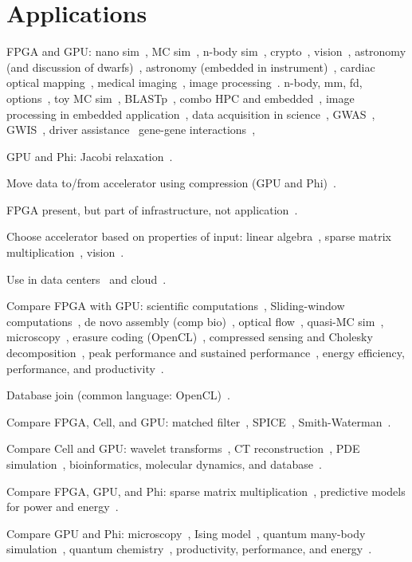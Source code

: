 \section{Applications}
\label{sec:apps}

FPGA and GPU:
nano sim~\cite{khdo06},
MC sim~\cite{shsc08,tttl10},
n-body sim~\cite{tl10},
crypto~\cite{dfg+13},
vision~\cite{bkdb10,brf14,ghgb11},
astronomy (and discussion of dwarfs)~\cite{ibs12},
astronomy (embedded in instrument)~\cite{kgb+14},
cardiac optical mapping~\cite{mjk12},
medical imaging~\cite{szb+12,sll13},
image processing~\cite{dbd+13}.
n-body, mm, fd, options~\cite{whk+14},
toy MC sim~\cite{admb14},
BLASTp~\cite{Papad14},
combo HPC and embedded~\cite{rpm+15},
image processing in embedded application~\cite{enr+18,nsg+16,zxl+18},
data acquisition in science~\cite{cab+17,vac+16},
GWAS~\cite{kws+16},
GWIS~\cite{wkhe17},
driver assistance~\cite{wlhk17}
gene-gene interactions~\cite{wkhe18},

GPU and Phi:
Jacobi relaxation~\cite{cv16}.

Move data to/from accelerator using compression (GPU and Phi)~\cite{bkp15}.

FPGA present, but part of infrastructure, not application~\cite{abb+13}.

Choose accelerator based on properties of input:
linear algebra~\cite{gchg16,sll+13},
sparse matrix multiplication~\cite{gsbh16},
vision~\cite{mfo+16}.

Use in data centers~\cite{fds+17} and cloud~\cite{sm16}.

Compare FPGA with GPU:
scientific computations~\cite{wghp11},
Sliding-window computations~\cite{cfbs15},
de novo assembly (comp bio)~\cite{mjk+16},
optical flow~\cite{bnw+10}, quasi-MC sim~\cite{tb10},
microscopy~\cite{tzwz15}, erasure coding (OpenCL)~\cite{czs+16},
compressed sensing and Cholesky decomposition~\cite{ypl12},
peak performance and sustained performance~\cite{vn14},
energy efficiency, performance, and productivity~\cite{cdde13}.

Database join (common language: OpenCL)~\cite{rl17}.

Compare FPGA, Cell, and GPU:
matched filter~\cite{bgt07}, SPICE~\cite{kd09}, Smith-Waterman~\cite{bal+12}.

Compare Cell and GPU:
wavelet transforms~\cite{bck+11}, CT reconstruction~\cite{skkh07},
PDE simulation~\cite{rd10},
bioinformatics, molecular dynamics, and database~\cite{pts+12}.

Compare FPGA, GPU, and Phi:
sparse matrix multiplication~\cite{gsbh16},
predictive models for power and energy~\cite{opr+17}.

Compare GPU and Phi:
microscopy~\cite{tkk+14}, Ising model~\cite{ws13},
quantum many-body simulation~\cite{Lyakh15},
quantum chemistry~\cite{lrg14},
productivity, performance, and energy~\cite{mlp+17}.
